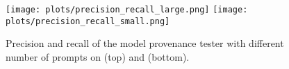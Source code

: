 \begin{comment}
\begin{figure}[h]
  \texttt{[image: plots/precision\_recall\_large.png]}
  \caption{Precision and recall for \bencho.}
  \label{fig:eval:accuracy-a}
\end{figure}

\begin{figure}[h]
\texttt{[image: plots/precision\_recall\_small.png]}
\caption{Precision and recall for \bencht.}
\label{fig:eval:accuracy-b}
\end{figure}
\end{comment}


\begin{figure}[h]
    \centering
    \subfigure%
    {
        \texttt{[image: plots/precision\_recall\_large.png]}
        \label{fig:eval:accuracy-a}
    }
    \subfigure%
    {
        \texttt{[image: plots/precision\_recall\_small.png]}
        \label{fig:eval:accuracy-b}
    }
    \caption{Precision and recall of the model provenance tester with different number of prompts on \bencho (top) and \bencht (bottom). }
    \label{fig:eval:accuracy}
\end{figure}
